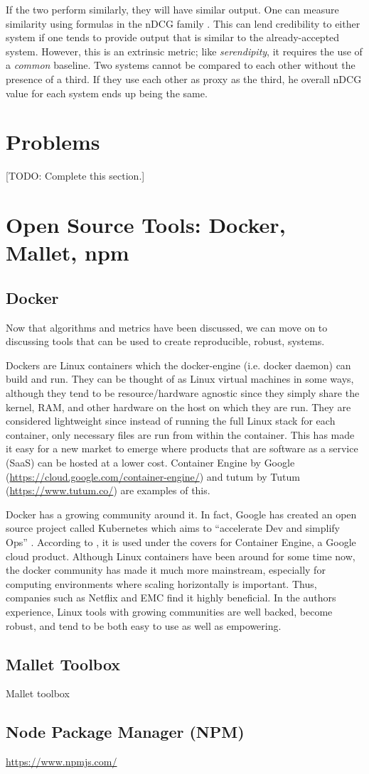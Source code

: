 If the two perform similarly, they will have similar output. One can measure similarity using formulas in the nDCG family \citep{Wang:2006:TOT:1150402.1150450}. This can lend credibility to either system if one tends to provide output that is similar to the already-accepted system. However, this is an extrinsic metric; like \emph{serendipity}, it requires the use of a \textit{common} baseline. Two systems cannot be compared to each other without the presence of a third. If they use each other as proxy as the third, he overall nDCG value for each system ends up being the same.


\section{Problems}

[TODO: Complete this section.]


\section{Open Source Tools: Docker, Mallet, npm}

\subsection{Docker\*}
Now that algorithms and metrics have been discussed, we can move on to discussing tools that can be used to create reproducible, robust, systems.

Dockers are Linux containers which the docker-engine (i.e. docker daemon) can build and run. They can be thought of as Linux virtual machines in some ways, although they tend to be resource/hardware agnostic since they simply share the kernel, RAM, and other hardware on the host on which they are run. They are considered lightweight since instead of running the full Linux stack for each container, only necessary files are run from within the container. This has made it easy for a new market to emerge where products that are software as a service (SaaS) can be hosted at a lower cost. Container Engine by Google (\url{https://cloud.google.com/container-engine/}) and tutum by Tutum (\url{https://www.tutum.co/}) are examples of this.

Docker has a growing community around it. In fact, Google has created an open source project called Kubernetes which aims to ``accelerate Dev and simplify Ops'' \citep{kube_website}. According to \cite{google_container_engine}, it is used under the covers for Container Engine, a Google cloud product. Although Linux containers have been around for some time now, the docker community has made it much more mainstream, especially for computing environments where scaling horizontally is important. Thus, companies such as Netflix and EMC find it highly beneficial. In the authors experience, Linux tools with growing communities are well backed, become robust, and tend to be both easy to use as well as empowering.

\subsection{Mallet Toolbox}
Mallet toolbox

\subsection{Node Package Manager (NPM)}
 \url{https://www.npmjs.com/}
